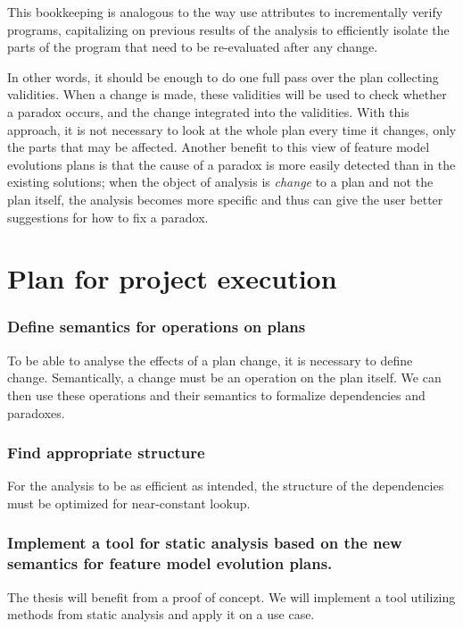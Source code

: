 \documentclass[a4paper,english]{ifimaster}
\begin{document}
This bookkeeping is analogous to the way \citeauthor{article:syntax-driven-program-verification}\parencite{article:syntax-driven-program-verification, art:inc-syntactic-semantic} use attributes to incrementally verify programs, capitalizing on previous results of the analysis to efficiently isolate the parts of the program that need to be re-evaluated after any change. 

In other words, it should be enough to do one full pass over the plan collecting validities. When a change is made, these validities will be used to check whether a paradox occurs, and the change integrated into the validities. With this approach, it is not necessary to look at the whole plan every time it changes, only the parts that may be affected. Another benefit to this view of feature model evolutions plans is that the cause of a paradox is more easily detected than in the existing solutions; when the object of analysis is \emph{change} to a plan and not the plan itself, the analysis becomes more specific and thus can give the user better suggestions for how to fix a paradox. 

\section{Plan for project execution}
\label{sec:plan-for-project-execution}

\subsubsection*{Define semantics for operations on plans}
To be able to analyse the effects of a plan change, it is necessary to define change. Semantically, a change must be an operation on the plan itself. We can then use these operations and their semantics to formalize dependencies and paradoxes.

\subsubsection*{Find appropriate structure}
For the analysis to be as efficient as intended, the structure of the dependencies must be optimized for near-constant lookup.

\subsubsection*{Implement a tool for static analysis based on the new semantics for feature model evolution plans.}
The thesis will benefit from a proof of concept. We will implement a tool utilizing methods from static analysis and apply it on a use case. 
\end{document}
